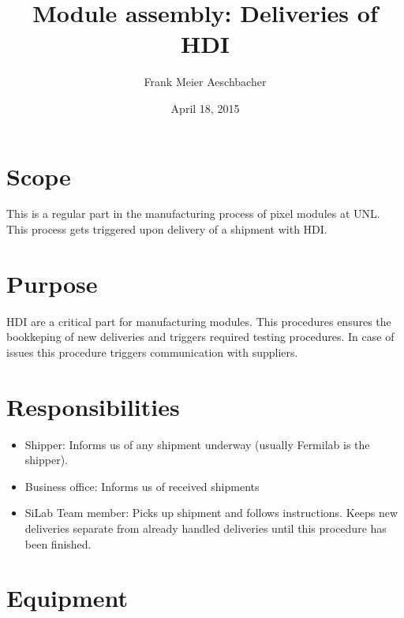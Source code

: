 \documentclass[12pt]{unlsilabsop}
\title{Module assembly: Deliveries of HDI}
\date{April 18, 2015}
\author{Frank Meier Aeschbacher}
\begin{document}
\maketitle

\section{Scope}
This is a regular part in the manufacturing process of pixel modules at UNL. This process gets triggered upon delivery of a shipment with HDI.

\section{Purpose}
HDI are a critical part for manufacturing modules. This procedures ensures the bookkeping of new deliveries and triggers required testing procedures. In case of issues this procedure triggers communication with suppliers.


\section{Responsibilities}

\begin{itemize}
    \item Shipper: Informs us of any shipment underway (usually Fermilab is the shipper).
    \item Business office: Informs us of received shipments
    \item SiLab Team member: Picks up shipment and follows instructions. Keeps new deliveries separate from already handled deliveries until this procedure has been finished.
\end{itemize}

\section{Equipment}
\end{document}
